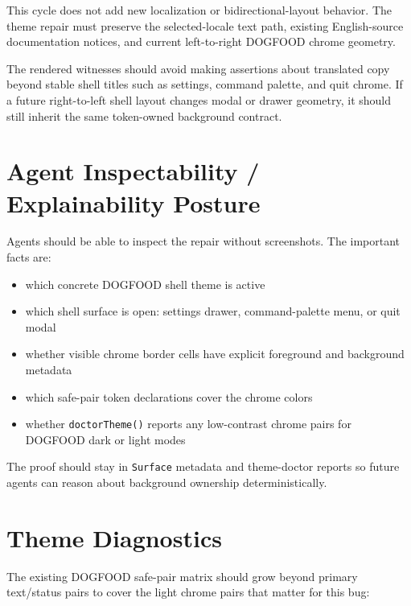 This cycle does not add new localization or bidirectional-layout behavior. The theme repair must preserve the selected-locale text path, existing English-source documentation notices, and current left-to-right DOGFOOD chrome geometry.

The rendered witnesses should avoid making assertions about translated copy beyond stable shell titles such as settings, command palette, and quit chrome. If a future right-to-left shell layout changes modal or drawer geometry, it should still inherit the same token-owned background contract.

\section{Agent Inspectability / Explainability Posture}\label{record-182-agent-inspectability-explainability-posture}

Agents should be able to inspect the repair without screenshots. The important facts are:

\begin{itemize}
\tightlist
\item
  which concrete DOGFOOD shell theme is active
\item
  which shell surface is open: settings drawer, command-palette menu, or quit modal
\item
  whether visible chrome border cells have explicit foreground and background metadata
\item
  which safe-pair token declarations cover the chrome colors
\item
  whether \texttt{d\allowbreak{}o\allowbreak{}c\allowbreak{}t\allowbreak{}o\allowbreak{}r\allowbreak{}T\allowbreak{}h\allowbreak{}e\allowbreak{}m\allowbreak{}e\allowbreak{}(\allowbreak{})} reports any low-contrast chrome pairs for DOGFOOD dark or light modes
\end{itemize}

The proof should stay in \texttt{S\allowbreak{}u\allowbreak{}r\allowbreak{}f\allowbreak{}a\allowbreak{}c\allowbreak{}e} metadata and theme-doctor reports so future agents can reason about background ownership deterministically.

\section{Theme Diagnostics}\label{record-182-theme-diagnostics}

The existing DOGFOOD safe-pair matrix should grow beyond primary text/status pairs to cover the light chrome pairs that matter for this bug:

